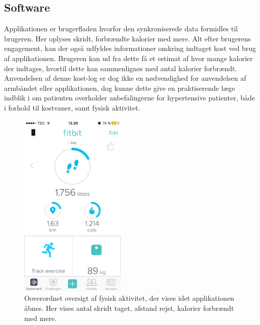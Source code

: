 \subsection{Software}
Applikationen er brugerfladen hvorfor den synkroniserede data formidles til brugeren. Her oplyses skridt, forbrændte kalorier med mere. 
Alt efter brugerens engagement, kan der også udfyldes informationer omkring indtaget kost ved brug af applikationen. Brugeren kan ud fra dette få et estimat af hvor mange kalorier der indtages, hvortil dette kan sammenlignes med antal kalorier forbrændt. Anvendelsen af denne kost-log er dog ikke en nødvendighed for anvendelsen af armbåndet eller applikationen, dog kunne dette give en praktiserende læge indblik i om patienten overholder anbefalingerne for hypertensive patienter, både i forhold til kostvaner, samt fysisk aktivitet.  

\begin{figure}[H]
	\centering
	\includegraphics[width=0.45\textwidth]{figures/burgerfladeoversigt}
	\caption{Ooverordnet oversigt af fysisk aktivitet, der vises idet applikationen åbnes. Her vises antal skridt taget, afstand rejst, kalorier forbrændt med mere.}
	\label{fig:brugerfladeoversigt}
\end{figure}

